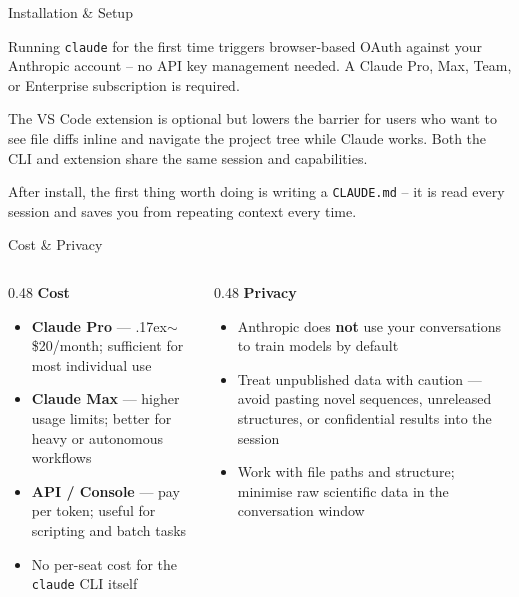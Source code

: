 \documentclass[aspectratio=169, 10pt]{beamer}
\begin{document}
\begin{frame}{Installation \& Setup}
{  Running \texttt{claude} for the first time triggers browser-based OAuth against your Anthropic account -- no API key management needed. A Claude Pro, Max, Team, or Enterprise subscription is required.\par
  The VS Code extension is optional but lowers the barrier for users who want to see file diffs inline and navigate the project tree while Claude works. Both the CLI and extension share the same session and capabilities.\par
  After install, the first thing worth doing is writing a \texttt{CLAUDE.md} -- it is read every session and saves you from repeating context every time.}
\end{frame}

\begin{frame}{Cost \& Privacy}
  \begin{columns}[T]
    \begin{column}{0.48\textwidth}
      \textbf{\color{biokteal}Cost}
      \begin{itemize}[label=\textbullet]\setlength\itemsep{4pt}
        \item \textbf{Claude Pro} --- {\raise.17ex\hbox{$\scriptstyle\sim$}}\$20/month; sufficient for most individual use
        \item \textbf{Claude Max} --- higher usage limits; better for heavy or autonomous workflows
        \item \textbf{API / Console} --- pay per token; useful for scripting and batch tasks
        \item No per-seat cost for the \texttt{claude} CLI itself
      \end{itemize}
    \end{column}
    \begin{column}{0.48\textwidth}
      \textbf{\color{biokteal}Privacy}
      \begin{itemize}[label=\textbullet]\setlength\itemsep{4pt}
        \item Anthropic does \textbf{not} use your conversations to train models by default
        \item Treat unpublished data with caution --- avoid pasting novel sequences, unreleased structures, or confidential results into the session
        \item Work with file paths and structure; minimise raw scientific data in the conversation window
      \end{itemize}
      \vspace{0.4em}

\end{column}
\end{columns}
\end{frame}
\end{document}
